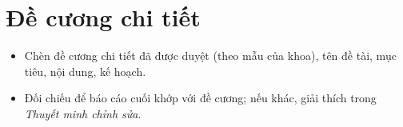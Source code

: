 \chapter*{Đề cương chi tiết}

\begin{goiy}
  \begin{itemize}
    \item Chèn đề cương chi tiết đã được duyệt (theo mẫu của khoa), tên đề tài, mục tiêu, nội dung, kế hoạch.
    \item Đối chiếu để báo cáo cuối khớp với đề cương; nếu khác, giải thích trong \emph{Thuyết minh chỉnh sửa}.
  \end{itemize}
\end{goiy}
